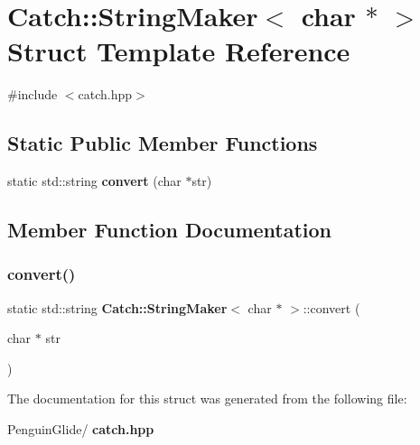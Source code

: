 \section{Catch\+::String\+Maker$<$ char $\ast$ $>$ Struct Template Reference}
\label{struct_catch_1_1_string_maker_3_01char_01_5_01_4}


{\ttfamily \#include $<$catch.\+hpp$>$}

\subsection*{Static Public Member Functions}
\begin{DoxyCompactItemize}
\item 
static std\+::string \textbf{ convert} (char $\ast$str)
\end{DoxyCompactItemize}


\subsection{Member Function Documentation}
\mbox{\label{struct_catch_1_1_string_maker_3_01char_01_5_01_4_a33049e24281ea6fba48bd8817bdd52bd}} 
\subsubsection{convert()}
{\footnotesize\ttfamily static std\+::string \textbf{ Catch\+::\+String\+Maker}$<$ char $\ast$ $>$\+::convert (\begin{DoxyParamCaption}\item[{char $\ast$}]{str }\end{DoxyParamCaption})\hspace{0.3cm}{\ttfamily [static]}}



The documentation for this struct was generated from the following file\+:\begin{DoxyCompactItemize}
\item 
Penguin\+Glide/\textbf{ catch.\+hpp}\end{DoxyCompactItemize}
